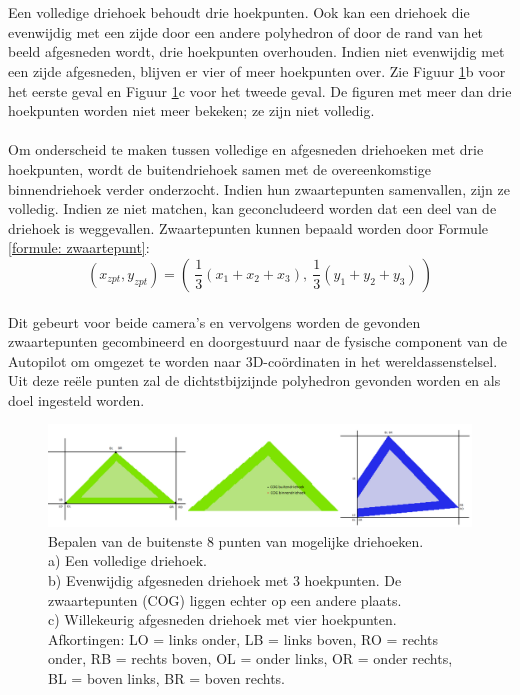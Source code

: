 \\\\
Een volledige driehoek behoudt drie hoekpunten. Ook kan een driehoek die evenwijdig met een zijde door een andere polyhedron of door de rand van het beeld afgesneden wordt, drie hoekpunten overhouden. Indien niet evenwijdig met een zijde afgesneden, blijven er vier of meer hoekpunten over. Zie Figuur \ref{fig:DrieGevallenDriehoeken}b voor het eerste geval en Figuur \ref{fig:DrieGevallenDriehoeken}c voor het tweede geval. De figuren met meer dan drie hoekpunten worden niet meer bekeken; ze zijn niet volledig.
\\\\
Om onderscheid te maken tussen volledige en afgesneden driehoeken met drie hoekpunten, wordt de buitendriehoek samen met de overeenkomstige binnendriehoek verder onderzocht. Indien hun zwaartepunten samenvallen, zijn ze volledig. Indien ze niet matchen, kan geconcludeerd worden dat een deel van de driehoek is weggevallen. Zwaartepunten kunnen bepaald worden door Formule \ref{formule: zwaartepunt}: \begin{equation}
\label{formule: zwaartepunt}
(x_{zpt},y_{zpt}) = ( \ \frac{1}{3}(x_1 + x_2 + x_3) , \ \frac{1}{3}(y_1 + y_2 + y_3) \ )
\end{equation}
\\
Dit gebeurt voor beide camera's en vervolgens worden de gevonden zwaartepunten gecombineerd en doorgestuurd naar de fysische component van de Autopilot om omgezet te worden naar 3D-co\"ordinaten in het wereldassenstelsel. Uit deze re\"ele punten zal de dichtstbijzijnde polyhedron gevonden worden en als doel ingesteld worden.
\\
\begin{figure}[h]
	\centering
	\includegraphics[width=1\textwidth]{BeeldverwerkingDriehoeken.png}
	\caption{Bepalen van de buitenste 8 punten van mogelijke driehoeken. \\ a) Een volledige driehoek. \\ b) Evenwijdig afgesneden driehoek met 3 hoekpunten. De zwaartepunten (COG) liggen echter op een andere plaats. \\ c) Willekeurig afgesneden driehoek met vier hoekpunten. \\ 
	Afkortingen: LO = links onder, LB = links boven, RO = rechts onder, RB = rechts boven, OL = onder links, OR = onder rechts, BL = boven links, BR = boven rechts.}
	\label{fig:DrieGevallenDriehoeken}
\end{figure}

